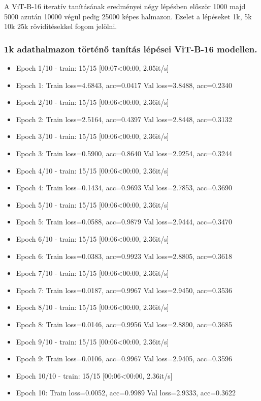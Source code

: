 A ViT-B-16 iteratív tanításának eredményei négy lépésben először 1000 majd 5000 azután 10000 végül pedig 25000 képes halmazon. Ezelet a lépéseket 1k, 5k 10k 25k rövidítésekkel fogom jelölni.

\subsubsection{1k adathalmazon történő tanítás lépései ViT-B-16 modellen.}
  \begin{itemize} 
    \item Epoch 1/10 - train: 15/15 [00:07<00:00, 2.05it/s]
    \item Epoch 1: Train loss=4.6843, acc=0.0417 Val loss=3.8488, acc=0.2340
    \item Epoch 2/10 - train: 15/15 [00:06<00:00, 2.36it/s]
    \item Epoch 2: Train loss=2.5164, acc=0.4397 Val loss=2.8448, acc=0.3132
    \item Epoch 3/10 - train: 15/15 [00:06<00:00, 2.36it/s]
    \item Epoch 3: Train loss=0.5900, acc=0.8640 Val loss=2.9254, acc=0.3244
    \item Epoch 4/10 - train: 15/15 [00:06<00:00, 2.36it/s]
    \item Epoch 4: Train loss=0.1434, acc=0.9693 Val loss=2.7853, acc=0.3690
    \item Epoch 5/10 - train: 15/15 [00:06<00:00, 2.36it/s]
    \item Epoch 5: Train loss=0.0588, acc=0.9879 Val loss=2.9444, acc=0.3470
    \item Epoch 6/10 - train: 15/15 [00:06<00:00, 2.36it/s]
    \item Epoch 6: Train loss=0.0383, acc=0.9923 Val loss=2.8805, acc=0.3618
    \item Epoch 7/10 - train: 15/15 [00:06<00:00, 2.36it/s]
    \item Epoch 7: Train loss=0.0187, acc=0.9967 Val loss=2.9450, acc=0.3536
    \item Epoch 8/10 - train: 15/15 [00:06<00:00, 2.36it/s]
    \item Epoch 8: Train loss=0.0146, acc=0.9956 Val loss=2.8890, acc=0.3685
    \item Epoch 9/10 - train: 15/15 [00:06<00:00, 2.36it/s]
    \item Epoch 9: Train loss=0.0106, acc=0.9967 Val loss=2.9405, acc=0.3596
    \item Epoch 10/10 - train: 15/15 [00:06<00:00, 2.36it/s]
    \item Epoch 10: Train loss=0.0052, acc=0.9989 Val loss=2.9333, acc=0.3622
  \end{itemize}

